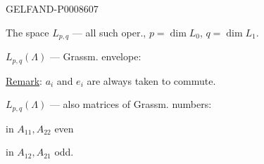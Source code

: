\begin{GelfandAdjacentEvidence}{GELFAND-P000860}{7}


The space \(L_{p,q}\) — all such oper., \(p=\dim L_0\), \(q=\dim L_1\).

\(L_{p,q}(\Lambda)\) — Grassm. envelope:

\uline{Remark}: \(a_i\) and \(e_i\) are always taken to commute.

\(L_{p,q}(\Lambda)\) — also matrices of Grassm. numbers:

in \(A_{11},A_{22}\) even
\end{GelfandAdjacentEvidence}


in \(A_{12},A_{21}\) odd.


